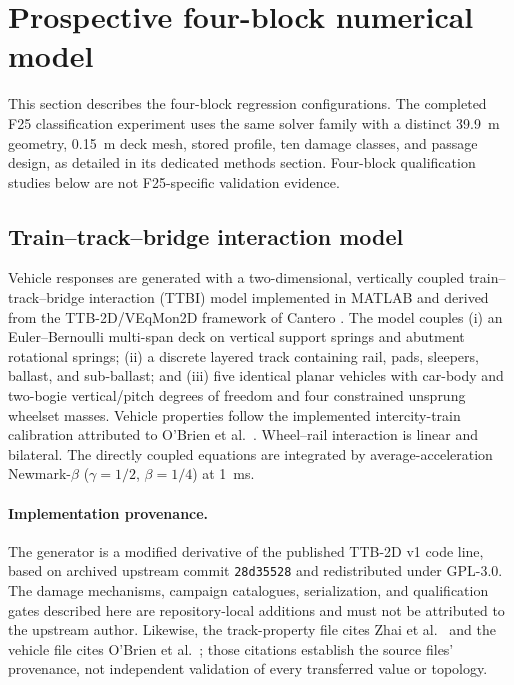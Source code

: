 \section{Prospective four-block numerical model}
\label{sec:simulation}

This section describes the four-block regression configurations. The completed
F25 classification experiment uses the same solver family with a distinct
39.9~m geometry, 0.15~m deck mesh, stored profile, ten damage classes, and
passage design, as detailed in its dedicated methods section. Four-block
qualification studies below are not F25-specific validation evidence.

\subsection{Train--track--bridge interaction model}
\label{sec:ttbi}

Vehicle responses are generated with a two-dimensional, vertically coupled
train--track--bridge interaction (TTBI) model implemented in MATLAB and derived
from the TTB-2D/VEqMon2D framework of Cantero
\cite{cantero_ttb2d, cantero2022veqmon}. The model couples (i) an
Euler--Bernoulli multi-span deck on vertical support springs and abutment
rotational springs; (ii) a discrete layered track containing rail, pads,
sleepers, ballast, and sub-ballast; and (iii) five identical planar vehicles
with car-body and two-bogie vertical/pitch degrees of freedom and four
constrained unsprung wheelset masses. Vehicle properties follow the
implemented intercity-train calibration attributed to O'Brien et
al.~\cite{obrien2018vehicle}. Wheel--rail interaction is linear and bilateral.
The directly coupled equations are integrated by average-acceleration
Newmark-$\beta$ ($\gamma=1/2$, $\beta=1/4$) at 1~ms.

\paragraph{Implementation provenance.}
The generator is a modified derivative of the published TTB-2D v1 code line,
based on archived upstream commit \texttt{28d35528} and redistributed under
GPL-3.0. The damage mechanisms, campaign catalogues, serialization, and
qualification gates described here are repository-local additions and must not
be attributed to the upstream author. Likewise, the track-property file cites
Zhai et al.~\cite{zhai2004track} and the vehicle file cites O'Brien et
al.~\cite{obrien2018vehicle}; those citations establish the source files'
provenance, not independent validation of every transferred value or topology.

